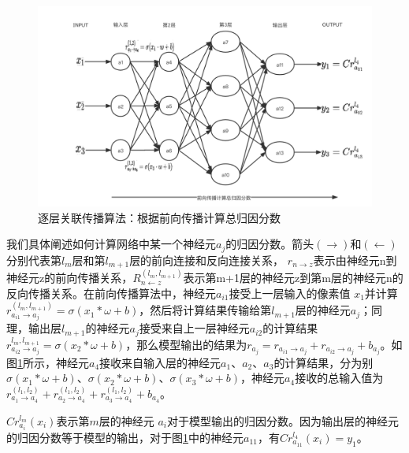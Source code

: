 \begin{figure}[!hbt]
\centering
	\includegraphics[scale=0.25]{fig2/C3/自适应-前向传播}%
	\caption{逐层关联传播算法：根据前向传播计算总归因分数}
	\label{fig:逐层关联传播算法：根据前向传播计算总归因分数}	
\end{figure}

我们具体阐述如何计算网络中某一个神经元$a_{j}$的归因分数。箭头$(\rightarrow)$和$(\leftarrow)$分别代表第$l_{m}$层和第$l_{m+1}$层的前向连接和反向连接关系， $r_{n \rightarrow z}$表示由神经元n到神经元z的前向传播关系，$R_{n \leftarrow z}^{(l_{m}, l_{m+1})}$表示第m+1层的神经元z到第m层的神经元n的反向传播关系。在前向传播算法中，神经元$a_{i1}$接受上一层输入的像素值 $x_{1}$并计算$r_{a_{i1} \rightarrow a_{j}}^{(l_{m}, l_{m+1})}=\sigma\left(x_{1} * \omega+b\right)$，然后将计算结果传输给第$l_{m+1}$层的神经元$a_{j}$；同理，输出层$l_{m+1}$的神经元$a_{j}$接受来自上一层神经元$a_{i2}$的计算结果$r_{a_{i2} \rightarrow a_{j}}^{l_{m}, l_{m+1}}=\sigma\left(x_{2} * \omega+b\right)$，那么模型输出的结果为$r_{a_{j}}=r_{a_{i1} \rightarrow a_{j}}+r_{a_{i2} \rightarrow a_{j}}+b_{a_{j}}$。如图\ref{fig:逐层关联传播算法：根据前向传播计算总归因分数}所示，神经元$a_{4}$接收来自输入层的神经元$a_{1}$、$a_{2}$、$a_{3}$的计算结果，分为别$\sigma\left(x_{1} * \omega+b\right)$、$\sigma\left(x_{2} * \omega+b\right)$、$\sigma\left(x_{3} * \omega+b\right)$，神经元$a_{4}$接收的总输入值为$r_{a_{1} \rightarrow a_{4}}^{(l_{1}, l_{2})}+r_{a_{2} \rightarrow a_{4}}^{(l_{1}, l_{2})}+r_{a_{3} \rightarrow a_{4}}^{(l_{1}, l_{2})}+b_{a_{4}}$。

$C r_{a_{i}}^{l_{m}}\left(x_{i}\right)$表示第$m$层的神经元 $a_{i}$对于模型输出的归因分数。因为输出层的神经元的归因分数等于模型的输出，对于图\ref{fig:逐层关联传播算法：根据前向传播计算总归因分数}中的神经元$a_{11}$，有$C r_{a_{11}}^{l_{4}}\left(x_{i}\right)=y_{1}$。

